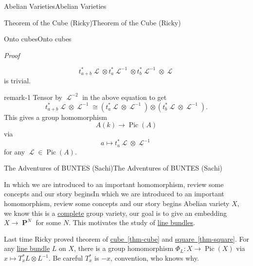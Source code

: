 \documentclass[10pt,]{book}
\makeatletter
\renewcommand*{\proofname}{Proof}
\renewenvironment{proof}[1][\proofname]{\par
  \pushQED{\qed}%
  \normalfont \topsep6\p@\@plus6\p@\relax
  \trivlist
  \item\relax
    {\itshape
    #1\@addpunct{.}}\hspace\labelsep\ignorespaces
}{%
  \popQED\endtrivlist\@endpefalse
}
\numberwithin{equation}{section}
\newcommand{\sheaf}[1]{\operatorname{\mathcal{#1}}}
\DeclareMathOperator{\Pic}{Pic}
\DeclareMathOperator{\PP}{\mathbf{P}}
\makeatother
\begin{document}
\begin{chapterptx}{Abelian Varieties}{}{Abelian Varieties}{}{}
\begin{sectionptx}{Theorem of the Cube (Ricky)}{}{Theorem of the Cube (Ricky)}{}{}
\begin{subsectionptx}{Onto cubes}{}{Onto cubes}{}{}
\begin{proof}
\begin{equation*}
t_{a+b}^*\sheaf L \otimes t_{a}^*\sheaf L ^{-1}\otimes t_b^* \sheaf L ^{-1} \otimes \sheaf L
\end{equation*}
is trivial.%
\end{proof}
\begin{remark}{}{remark-1}%
\hypertarget{p-132}{}%
Tensor by \(\sheaf L^{-2}\) in the above equation to get%
\begin{equation*}
t_{a+b}^*\sheaf L \otimes\sheaf L^{-1} \cong ( t_{a}^*\sheaf L \otimes \sheaf L^{-1}) \otimes(t_b^* \sheaf L\otimes \sheaf L^{-1})\text{.}
\end{equation*}
This gives a group homomorphism%
\begin{equation*}
A(k) \to \Pic(A)
\end{equation*}
via%
\begin{equation*}
a\mapsto t_a^*\sheaf L \otimes \sheaf L^{-1}
\end{equation*}
for any \(\sheaf L \in \Pic(A)\).%
\end{remark}
\end{subsectionptx}
\end{sectionptx}
%
%
\typeout{************************************************}
\typeout{************************************************}
%
\begin{sectionptx}{The Adventures of BUNTES (Sachi)}{}{The Adventures of BUNTES (Sachi)}{}{}\label{sec-adventures-buntes}
%
%
\typeout{************************************************}
\typeout{************************************************}
%
\begin{subsectionptx}{In which we are introduced to an important homomorphism, review some concepts and our story begins}{}{In which we are introduced to an important homomorphism, review some concepts and our story begins}{}{}\label{subsection-13}
\hypertarget{p-133}{}%
Abelian variety  \(X\), we know this is a \hyperref[def-abelian-complete-var]{complete} group variety, our goal is to give an embedding \(X\to \PP^N\) for some \(N\). This motivates the study of \hyperref[def-line-bundle]{line bundles}.%
\par
\hypertarget{p-134}{}%
Last time Ricky proved theorem of \hyperref[thm-cube]{cube~\ref{thm-cube}} and \hyperref[thm-square]{square~\ref{thm-square}}. For any \hyperref[def-line-bundle]{line bundle}  \(L\) on \(X\), there is a group homomorphism \(\Phi_L\colon X \to \Pic(X)\) via \(x\mapsto T_x^* L\otimes L^{-1}\). Be careful \(T_x^*\) is \(-x\), convention, who knows why.%

\end{subsectionptx}
\end{sectionptx}
\end{chapterptx}
\end{document}
